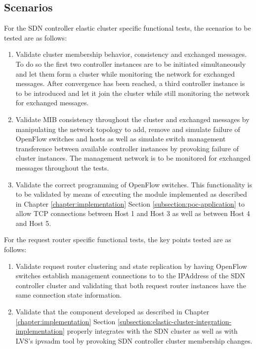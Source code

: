 \subsection{Scenarios}
\label{subsection:functional-tests-scenarios}
For the \gls{SDN} controller elastic cluster specific functional tests, the scenarios to be tested are as follows:
\begin{enumerate}
	\item Validate cluster membership behavior, consistency and exchanged messages. To do so the first two controller instances are to be initiated simultaneously and let them form a cluster while monitoring the network for exchanged messages. After convergence has been reached, a third controller instance is to be introduced and let it join the cluster while still monitoring the network for exchanged messages.
	\item Validate \gls{MIB} consistency throughout the cluster and exchanged messages by manipulating the network topology to add, remove and simulate failure of OpenFlow switches and hosts as well as simulate switch management transference between available controller instances by provoking failure of cluster instances. The management network is to be monitored for exchanged messages throughout the tests.
	\item Validate the correct programming of OpenFlow switches. This functionality is to be validated by means of executing the module implemented as described in Chapter \ref*{chapter:implementation} Section \ref{subsection:poc-application} to allow \gls{TCP} connections between Host 1 and Host 3 as well as between Host 4 and Host 5. 
\end{enumerate}
%
For the request router specific functional tests, the key points tested are as follows:
\begin{enumerate}
	\item Validate request router clustering and state replication by having OpenFlow switches establish management connections to to the \gls{IPAddress} of the \gls{SDN} controller cluster and validating that both request router instances have the same connection state information.
	\item Validate that the component developed as described in Chapter \ref*{chapter:implementation} Section \ref{subsection:elastic-cluster-integration-implementation} properly integrates with the \gls{SDN} cluster as well as with \gls{LVS}'s ipvsadm tool by provoking \gls{SDN} controller cluster membership changes.
\end{enumerate}
%
